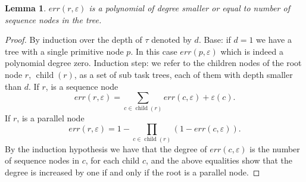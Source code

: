 \documentclass[review]{elsarticle}
\newtheorem{lemma}{Lemma}
\DeclareMathOperator{\ch}{\operatorname{child}}
\begin{document}
\begin{lemma}\label{lemma:poly}
	$err(r,\varepsilon)$ is a polynomial of degree smaller or equal to number of sequence nodes in the tree.  
\end{lemma}
\begin{proof}
By induction over the depth of $\tau$ denoted by $d$. Base: if $d=1$ we have a tree with a single primitive node $p$. In this case  $err(p,\varepsilon)$ which is indeed a polynomial degree zero.
Induction step: we refer to the children nodes of the root node $r$, $\ch(r)$, as a set of sub task trees, each of them with depth smaller than $d$. If $r$, is a sequence node 
$$err(r,\varepsilon)=\sum_{c\in \ch(r)}err(c,\varepsilon) +  \varepsilon(c).$$ 
If $r$, is a parallel node  $$err(r,\varepsilon)=1-\prod_{c\in \ch(r)} (1-err(c,\varepsilon)).$$ 
By the induction hypothesis we have that the degree of $err(c,\varepsilon)$ is the number of sequence nodes in $c$, for each child $c$, and the above equalities show that the degree is increased by one if and only if the root is a parallel node. 
\end{proof}



%
%
\end{document}
